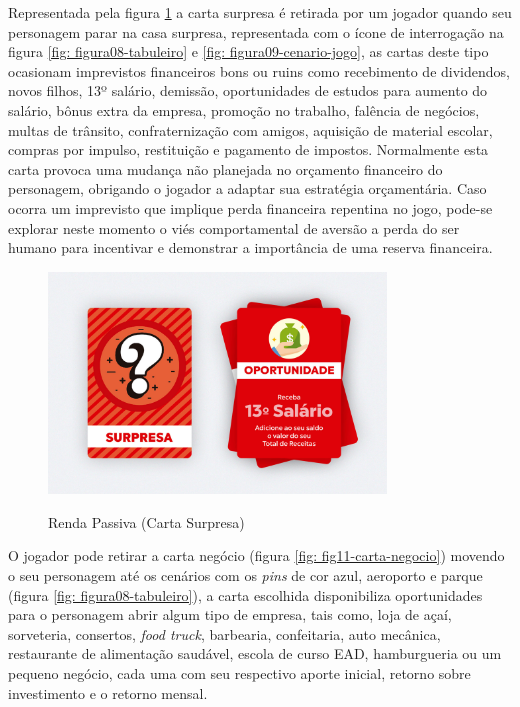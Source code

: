 Representada pela figura \ref{fig: fig10-carta-surpresa} a carta surpresa é retirada por um jogador quando seu personagem parar na casa surpresa, representada com o ícone de interrogação na figura \ref{fig: figura08-tabuleiro} e \ref{fig: figura09-cenario-jogo}, as cartas deste tipo ocasionam imprevistos financeiros bons ou ruins como recebimento de dividendos, novos filhos, 13º salário, demissão, oportunidades de estudos para aumento do salário, bônus extra da empresa, promoção no trabalho, falência de negócios, multas de trânsito, confraternização com amigos, aquisição de material escolar, compras por impulso, restituição e pagamento de impostos. Normalmente esta carta provoca uma mudança não planejada no orçamento financeiro do personagem, obrigando o jogador a adaptar sua estratégia orçamentária. Caso ocorra um imprevisto que implique perda financeira repentina no jogo, pode-se explorar neste momento o viés comportamental de aversão a perda do ser humano para incentivar e demonstrar a importância de uma reserva financeira.

\graphicspath{{figuras/}}
\begin{figure}[!ht]
\centering
\begin{minipage}{0.8\textwidth}
\caption{Renda Passiva (Carta Surpresa)}
\centering
\includegraphics[width=0.8\textwidth]{figuras/fig10-carta-surpresa.jpg}
\label{fig: fig10-carta-surpresa}
\end{minipage}
\end{figure}

\newpage
O jogador pode retirar a carta negócio (figura \ref{fig: fig11-carta-negocio}) movendo o seu personagem até os cenários com os \textit{pins} de cor azul, aeroporto e parque (figura \ref{fig: figura08-tabuleiro}), a carta escolhida disponibiliza oportunidades para o personagem abrir algum tipo de empresa, tais como, loja de açaí, sorveteria, consertos, \textit{food truck}, barbearia, confeitaria, auto mecânica, restaurante de alimentação saudável, escola de curso EAD, hamburgueria ou um pequeno negócio, cada uma com seu respectivo aporte inicial, retorno sobre investimento e o retorno mensal.

